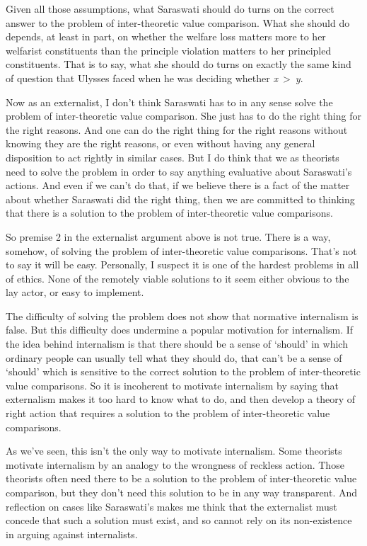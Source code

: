 \documentclass[
  10pt,
  letterpaper,
  twoside]{scrbook}
\begin{document}
Given all those assumptions, what {Saraswati} should do turns on the
correct answer to the problem of inter-theoretic value comparison. What
she should do depends, at least in part, on whether the welfare loss
matters more to her welfarist constituents than the principle violation
matters to her principled constituents. That is to say, what she should
do turns on exactly the same kind of question that {Ulysses} faced when
he was deciding whether \emph{x}~\textgreater~\emph{y}.

Now as an externalist, I don't think {Saraswati} has to in any sense
solve the problem of inter-theoretic value comparison. She just has to
do the right thing for the right reasons. And one can do the right thing
for the right reasons without knowing they are the right reasons, or
even without having any general disposition to act rightly in similar
cases. But I do think that we as theorists need to solve the problem in
order to say anything evaluative about {Saraswati}'s actions. And even
if we can't do that, if we believe there is a fact of the matter about
whether {Saraswati} did the right thing, then we are committed to
thinking that there is a solution to the problem of inter-theoretic
value comparisons.

So premise 2 in the externalist argument above is not true. There is a
way, somehow, of solving the problem of inter-theoretic value
comparisons. That's not to say it will be easy. Personally, I suspect it
is one of the hardest problems in all of ethics. None of the remotely
viable solutions to it seem either obvious to the lay actor, or easy to
implement.

The difficulty of solving the problem does not show that normative
internalism is false. But this difficulty does undermine a popular
motivation for internalism. If the idea behind internalism is that there
should be a sense of `should' in which ordinary people can usually tell
what they should do, that can't be a sense of `should' which is
sensitive to the correct solution to the problem of inter-theoretic
value comparisons. So it is incoherent to motivate internalism by saying
that externalism makes it too hard to know what to do, and then develop
a theory of right action that requires a solution to the problem of
inter-theoretic value comparisons.

As we've seen, this isn't the only way to motivate internalism. Some
theorists motivate internalism by an analogy to the wrongness of
reckless action. Those theorists often need there to be a solution to
the problem of inter-theoretic value comparison, but they don't need
this solution to be in any way transparent. And reflection on cases like
{Saraswati}'s makes me think that the externalist must concede that such
a solution must exist, and so cannot rely on its non-existence in
arguing against internalists.
\end{document}
